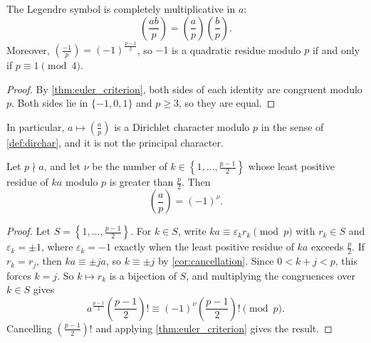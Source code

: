 \begin{corollary}\label{cor:legendre_multiplicative}
    The Legendre symbol is completely multiplicative in $a$:
    \begin{equation*}
        \left(\frac{ab}{p}\right) = \left(\frac{a}{p}\right)\left(\frac{b}{p}\right).
    \end{equation*}
    Moreover, $\left(\frac{-1}{p}\right) = (-1)^{\frac{p-1}{2}}$, so $-1$ is a quadratic residue modulo $p$ if and only if $p \equiv 1 \pmod 4$.
\end{corollary}
\begin{proof}
    By \cref{thm:euler_criterion}, both sides of each identity are congruent modulo $p$. Both sides lie in $\{-1, 0, 1\}$ and $p \ge 3$, so they are equal.
\end{proof}
In particular, $a \mapsto \left(\frac{a}{p}\right)$ is a Dirichlet character modulo $p$ in the sense of \cref{def:dirchar}, and it is not the principal character.

\begin{lemma}\label{lem:gauss_lemma_legendre}
    Let $p \nmid a$, and let $\nu$ be the number of $k \in \left\{1, \dots, \frac{p-1}{2}\right\}$ whose least positive residue of $ka$ modulo $p$ is greater than $\frac{p}{2}$. Then
    \begin{equation*}
        \left(\frac{a}{p}\right) = (-1)^\nu.
    \end{equation*}
\end{lemma}
\begin{proof}
    Let $S = \left\{1, \dots, \frac{p-1}{2}\right\}$. For $k \in S$, write $ka \equiv \varepsilon_k r_k \pmod p$ with $r_k \in S$ and $\varepsilon_k = \pm 1$, where $\varepsilon_k = -1$ exactly when the least positive residue of $ka$ exceeds $\frac{p}{2}$. If $r_k = r_j$, then $ka \equiv \pm ja$, so $k \equiv \pm j$ by \cref{cor:cancellation}. Since $0 < k + j < p$, this forces $k = j$. So $k \mapsto r_k$ is a bijection of $S$, and multiplying the congruences over $k \in S$ gives
    \begin{equation*}
        a^{\frac{p-1}{2}} \left(\frac{p-1}{2}\right)! \equiv (-1)^\nu \left(\frac{p-1}{2}\right)! \pmod p.
    \end{equation*}
    Cancelling $\left(\frac{p-1}{2}\right)!$ and applying \cref{thm:euler_criterion} gives the result.
\end{proof}

